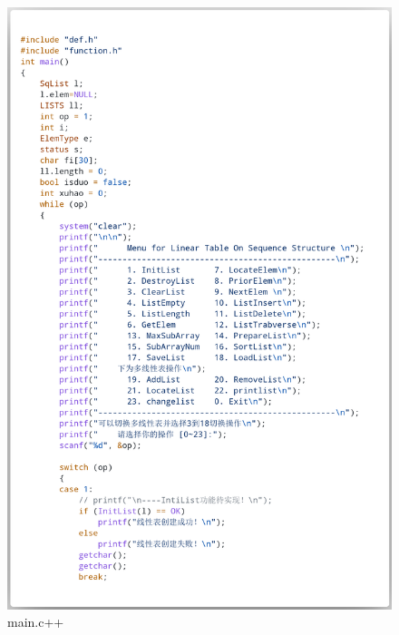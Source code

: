 \documentclass[supercite]{Experimental_Report}
\theoremstyle{definition}
\begin{document}
\begin{figure}[htb]
	\begin{center}
		\includegraphics[scale=0.30]{images/3-9.png}
		\caption{main.c++}
		\label{fig3-9}
	\end{center}
\end{figure}
\end{document}
